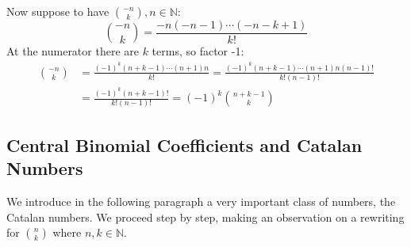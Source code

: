 Now suppose to have ${{-n}\choose{k}}, n\in \mathbb{N}  $:
\begin{displaymath}
  {{-n}\choose{k}} =  \frac{-n(-n-1)\cdots(-n-k+1)}{k!} 
\end{displaymath}
At the numerator there are $k$ terms, so factor -1:
\begin{displaymath}
  \begin{split}
    {{-n}\choose{k}} &= \frac{(-1)^k (n + k-1)\cdots(n+1)n}{k!} =
    \frac{(-1)^k (n + k-1)\cdots(n+1)n(n-1)!}{k!(n-1)!}\\
    &= \frac{(-1)^k (n + k-1)!}{k!(n-1)!} = (-1)^k {{n+k-1}\choose{k}}
  \end{split}
\end{displaymath}

\subsection{Central Binomial Coefficients and Catalan Numbers}

We introduce in the following paragraph a very important class of
numbers, the Catalan numbers. We proceed step by step, making an
observation on a rewriting for ${{n}\choose{k}}$ where $n,k\in
\mathbb{N} $.

